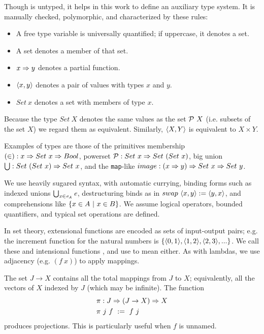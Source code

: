 \documentclass{llncs}
\begin{document}
Though \lzfclang is untyped, it helps in this work to define an auxiliary type system.
It is manually checked, polymorphic, and characterized by these rules:
\begin{itemize}
	\item A free type variable is universally quantified; if uppercase, it denotes a set.
	\item A set denotes a member of that set.
	\item $x \Rightarrow y$ denotes a partial function.
	\item $\langle{x,y}\rangle$ denotes a pair of values with types $x$ and $y$.
	\item $Set~x$ denotes a set with members of type $x$.
\end{itemize}
Because the type $Set~X$ denotes the same values as the set $\mathcal{P}~X$ (i.e. subsets of the set $X$) we regard them as equivalent.
Similarly, $\langle{X,Y}\rangle$ is equivalent to $X \times Y$.

Examples of types are those of the \lzfclang primitives membership $(\in) : x \Rightarrow Set~x \Rightarrow Bool$, powerset $\mathcal{P} : Set~x \Rightarrow Set~(Set~x)$, big union $\textstyle\bigcup : Set~(Set~x) \Rightarrow Set~x$, and the \texttt{map}-like $image : (x \Rightarrow y) \Rightarrow Set~x \Rightarrow Set~y$.

We use heavily sugared syntax, with automatic currying, binding forms such as indexed unions $\textstyle\bigcup_{\mathit{x} \in \mathit{e_A}}\mathit{e}$, destructuring binds as in $swap~\langle{x,y}\rangle := \langle{y,x}\rangle$, and comprehensions like $\lbrace {x \in A} \ \lvert\ {x \in B} \rbrace$.
We assume logical operators, bounded quantifiers, and typical set operations are defined.

In set theory, extensional functions are encoded as sets of input-output pairs; e.g. 
the increment function for the natural numbers is $\{{\langle{0,1}\rangle,\langle{1,2}\rangle,\langle{2,3}\rangle,...}\}$.
We call these  and intensional functions , and use  to mean either.
As with lambdas, we use adjacency (e.g. $(f~x)$) to apply mappings.

The set $J \to X$ contains all the total mappings from $J$ to $X$; equivalently, all the vectors of $X$ indexed by $J$ (which may be infinite).
The function
\begin{equation}
\begin{aligned}
	&\pi : J \Rightarrow (J \to X) \Rightarrow X \\
	&\pi~j~f \ := \ f~j
\end{aligned}
\end{equation}
produces projections. This is particularly useful when $f$ is unnamed.
\end{document}
